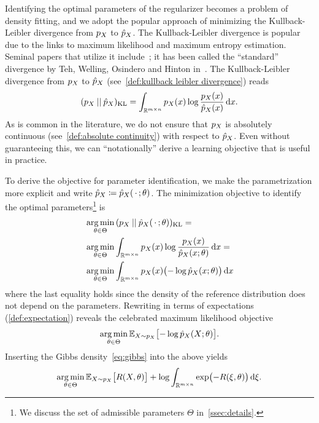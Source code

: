 Identifying the optimal parameters of the regularizer becomes a problem of density fitting, and we adopt the popular approach of minimizing the Kullback-Leibler divergence from \( p_X \) to \( \hat{p}_{X} \).
The Kullback-Leibler divergence is popular due to the links to maximum likelihood and maximum entropy estimation.
Seminal papers that utilize it include~\cite{hinton_training_2002,RoBl09,zhu_filters_1998}; it has been called the \enquote{standard} divergence by Teh, Welling, Osindero and Hinton in~\cite{teh_energy_2003}.
The Kullback-Leibler divergence from \( p_X \) to \( \hat{p}_{X} \) (see~\cref{def:kullback leibler divergence}) reads
\begin{equation}
	(p_X\mathbin{||}\hat{p}_{X})_{\mathrm{KL}} = \int_{\mathbb{R}^{m\times n}} p_X(x)\log\frac{p_X(x)}{\hat{p}_{X}(x)}\,\mathrm{d}x.
	\label{eq:kullback leibler deep neural regularizers}
\end{equation}
As is common in the literature, we do not ensure that \( p_X \) is absolutely continuous (see~\cref{def:absolute continuity}) with respect to \( \hat{p}_{X} \).
Even without guaranteeing this, we can \enquote{notationally} derive a learning objective that is useful in practice.

To derive the objective for parameter identification, we make the parametrization more explicit and write \( \hat{p}_{X} \coloneqq \hat{p}_{X}(\,\cdot\,; \theta) \).
The minimization objective to identify the optimal parameters\footnote{%
	We discuss the set of admissible parameters \( \Theta \) in~\cref{ssec:details}.
} is
\begin{equation}
	\begin{aligned}
		&\operatorname*{arg\,min}_{\theta \in \Theta}\,(p_X\mathbin{||}\hat{p}_{X}(\,\cdot\,; \theta))_{\mathrm{KL}} = \\
		&\operatorname*{arg\,min}_{\theta \in \Theta} \int_{\mathbb{R}^{m\times n}} p_X(x)\log\frac{p_X(x)}{\hat{p}_{X}(x; \theta)}\,\mathrm{d}x = \\
		&\operatorname*{arg\,min}_{\theta \in \Theta} \int_{\mathbb{R}^{m\times n}} p_X(x) \bigl( - \log \hat{p}_{X}(x; \theta)\bigr)\,\mathrm{d}x
	\end{aligned}
\end{equation}
where the last equality holds since the density of the reference distribution does not depend on the parameters.
Rewriting in terms of expectations (\cref{def:expectation}) reveals the celebrated maximum likelihood objective
\begin{equation}
	\operatorname*{arg\,min}_{\theta \in \Theta} \mathbb{E}_{X\sim p_X}\bigl[-\log \hat{p}_{X}(X; \theta) \bigr].
\end{equation}
Inserting the Gibbs density~\cref{eq:gibbs} into the above yields
\begin{equation}
	\operatorname*{arg\,min}_{\theta \in \Theta} \mathbb{E}_{X\sim p_X}\bigl[ R(X, \theta) \bigr] + \log\int_{\mathbb{R}^{m\times n}}\exp\bigl(-R(\xi, \theta)\bigr)\,\mathrm{d}\xi.
\end{equation}


